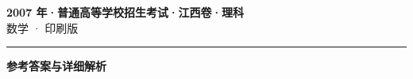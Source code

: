 \documentclass[zihao=5, a4paper]{ctexart}
\begin{document}
\begin{center}
  {\Large\bfseries 2007 年·普通高等学校招生考试·江西卷·理科}\\[4pt]
  {\large 数学 · 印刷版}
\end{center}
\medskip
{}

\par\bigskip\hrule\bigskip
{}
\begin{center}{\large\bfseries 参考答案与详细解析}\end{center}
\smallskip

\end{document}
